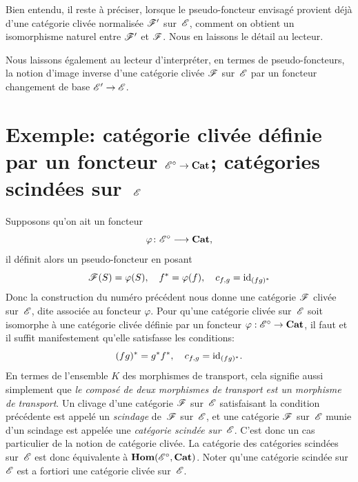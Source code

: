 Bien entendu, il reste \`a pr\'eciser, lorsque le pseudo-foncteur
envisag\'e provient d\'ej\`a d'une cat\'egorie cliv\'ee
normalis\'ee $\cal{F}'$ sur~$\cal{E}$, comment on obtient un
isomorphisme naturel entre $\cal{F}'$ et $\cal{F}$. Nous en laissons
le d\'etail au lecteur.

Nous laissons \'egalement au lecteur d'interpr\'eter, en termes de
pseudo-foncteurs, la notion d'image inverse d'une cat\'egorie
cliv\'ee $\cal{F}$ sur~$\cal{E}$ par un foncteur changement de base
$\cal{E}' \to\cal{E}$.

\section[Exemple]{Exemple: cat\'egorie cliv\'ee d\'efinie par un foncteur
$\cal{E}^\circ\to\Cat$; cat\'egories scind\'ees sur~$\cal{E}$}
\label{VI.9}
Supposons qu'on ait un foncteur
$$
\varphi\colon\cal{E}^\circ\to\Cat,
$$
il d\'efinit alors un pseudo-foncteur en posant
$$
\cal{F}(S)=\varphi(S),
\quad f^*=\varphi(f),\quad c_{f,g}=\id_{(fg)^*}
$$
Donc la construction du num\'ero pr\'ec\'edent nous donne une
cat\'egorie $\cal{F}$ cliv\'ee sur~$\cal{E}$, dite associ\'ee au
foncteur $\varphi$. Pour qu'une cat\'egorie cliv\'ee sur~$\cal{E}$
soit isomorphe \`a une cat\'egorie cliv\'ee d\'efinie par un
foncteur $\varphi:\cal{E}^\circ\to\Cat$, il faut et il suffit
manifestement qu'elle satisfasse les conditions:
$$
(fg)^*=g^*f^*,\quad c_{f,g}=\mathrm{id}_{(fg)^*}.
$$
En termes de l'ensemble $K$ des morphismes de transport, cela signifie
aussi simplement que \emph{le composé de deux morphismes de
transport est un morphisme de transport}. Un clivage d'une
cat\'egorie $\cal{F}$ sur~$\cal{E}$ satisfaisant la condition
pr\'ec\'edente est appel\'e un \emph{scindage}
de~$\cal{F}$ sur~$\cal{E}$, et une cat\'egorie $\cal{F}$
sur~$\cal{E}$ munie d'un scindage est appel\'ee une
\emph{catégorie scindée sur~$\cal{E}$}.
C'est donc un cas particulier de la notion de cat\'egorie
cliv\'ee. La cat\'egorie des cat\'egories scind\'ees
sur~$\cal{E}$ est donc \'equivalente \`a
$\SheafHom(\cal{E}^\circ,\Cat)$. Noter qu'une cat\'egorie
scind\'ee sur~$\cal{E}$ est a fortiori une cat\'egorie cliv\'ee
sur~$\cal{E}$.

